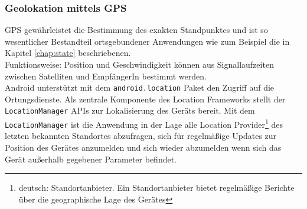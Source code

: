 \subsubsection{Geolokation mittels \gls{GPS}}
\gls{GPS} gewährleistet die Bestimmung des exakten Standpunktes und ist so wesentlicher Bestandteil ortsgebundener Anwendungen wie zum Beispiel die in Kapitel \ref{chap:state} beschriebenen. \\
Funktionsweise: Position und Geschwindigkeit können aus Signallaufzeiten zwischen Satelliten und EmpfängerIn bestimmt werden.\\
Android unterstützt mit dem \texttt{android.location} Paket den Zugriff auf die Ortungsdienste. Als zentrale Komponente des Location Frameworks stellt der \texttt{LocationManager} \glspl{API} zur Lokalisierung des Geräts bereit. Mit dem \texttt{LocationManager} ist die Anwendung in der Lage alle Location Provider\footnote{ deutsch: Standortanbieter. Ein Standortanbieter bietet regelmäßige Berichte über die geographische Lage des Gerätes} des letzten bekannten Standortes abzufragen, sich für regelmäßige Updates zur Position des Gerätes anzumelden und sich wieder abzumelden wenn sich das Gerät außerhalb gegebener Parameter befindet.
\cite{android_gps}
\clearpage
